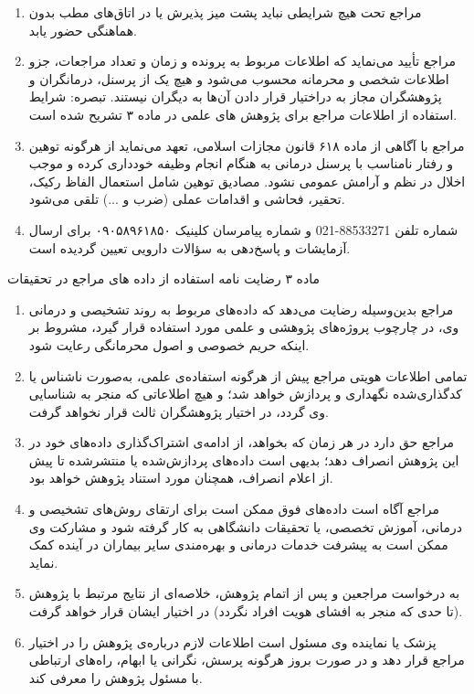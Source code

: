 \documentclass[12pt]{article}
\begin{document}
\begin{enumerate}
\item
مراجع تحت هیچ شرایطی نباید پشت میز پذیرش یا در اتاق‌های مطب بدون هماهنگی حضور یابد.
\item
مراجع تأیید می‌نماید که اطلاعات مربوط به پرونده و زمان و تعداد مراجعات، جزو اطلاعات شخصی و محرمانه محسوب می‌شود و هیچ یک از پرسنل، درمانگران و پژوهشگران مجاز به دراختیار قرار دادن آن‌ها به دیگران نیستند.
\newline
\XBZarBd تبصره:
\normalfont
شرایط استفاده از اطلاعات مراجع برای پژوهش های علمی در ماده ۳ تشریح شده است.
\item
مراجع با آگاهی از ماده ۶۱۸ قانون مجازات اسلامی، تعهد می‌نماید از هرگونه توهین و رفتار نامناسب با پرسنل درمانی به هنگام انجام وظیفه خودداری کرده و موجب اخلال در نظم و آرامش عمومی نشود. مصادیق توهین شامل استعمال الفاظ رکیک، تحقیر، فحاشی و اقدامات عملی (ضرب و ...) تلقی می‌شود.
\item
شماره تلفن 88533271-021 و شماره پیامرسان کلینیک ۰۹۰۵۸۹۶۱۸۵۰ برای ارسال آزمایشات و پاسخ‌دهی به سؤالات دارویی تعیین گردیده است.
\end{enumerate}


\vspace{0.5cm}
\large \XBZarBd
ماده ۳ رضایت نامه استفاده از داده های مراجع در تحقیقات
\normalsize \normalfont

\begin{enumerate}
\item
مراجع بدین‌وسیله رضایت می‌دهد که داده‌های مربوط به روند تشخیصی و درمانی وی، در چارچوب پروژه‌های پژوهشی و علمی مورد استفاده قرار گیرد، مشروط بر اینکه حریم خصوصی و اصول محرمانگی رعایت شود.
\item
تمامی اطلاعات هویتی مراجع پیش از هرگونه استفاده‌ی علمی، به‌صورت ناشناس یا کدگذاری‌شده نگهداری و پردازش خواهد شد؛ و هیچ اطلاعاتی که منجر به شناسایی وی گردد، در اختیار پژوهشگران ثالث قرار نخواهد گرفت.
\item
مراجع حق دارد در هر زمان که بخواهد، از ادامه‌ی اشتراک‌گذاری داده‌های خود در این پژوهش انصراف دهد؛ بدیهی است داده‌های پردازش‌شده یا منتشرشده تا پیش از اعلام انصراف، همچنان مورد استناد پژوهش خواهد بود.
\item
مراجع آگاه است داده‌های فوق ممکن است برای ارتقای روش‌های تشخیصی و درمانی، آموزش تخصصی، یا تحقیقات دانشگاهی به کار گرفته شود و مشارکت وی ممکن است به پیشرفت خدمات درمانی و بهره‌مندی سایر بیماران در آینده کمک نماید.
\item
به درخواست مراجعین و پس از اتمام پژوهش، خلاصه‌ای از نتایج مرتبط با پژوهش (تا حدی که منجر به افشای هویت افراد نگردد) در اختیار ایشان قرار خواهد گرفت.
\item
پزشک یا نماینده وی مسئول است اطلاعات لازم درباره‌ی پژوهش را در اختیار مراجع قرار دهد و در صورت بروز هرگونه پرسش، نگرانی یا ابهام، راه‌های ارتباطی با مسئول پژوهش را معرفی کند.
\end{enumerate}
\end{document}
